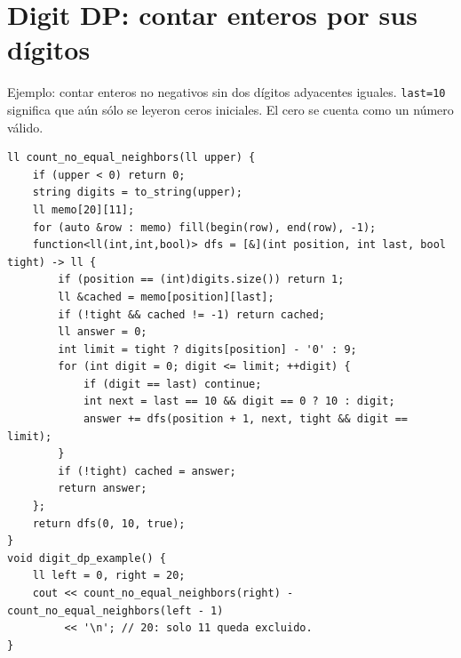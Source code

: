 \section{Digit DP: contar enteros por sus d\'igitos}

Ejemplo: contar enteros no negativos sin dos d\'igitos adyacentes iguales.
\texttt{last=10} significa que a\'un s\'olo se leyeron ceros iniciales.
El cero se cuenta como un n\'umero v\'alido.

\begin{lstlisting}[style=cpp]
ll count_no_equal_neighbors(ll upper) {
    if (upper < 0) return 0;
    string digits = to_string(upper);
    ll memo[20][11];
    for (auto &row : memo) fill(begin(row), end(row), -1);
    function<ll(int,int,bool)> dfs = [&](int position, int last, bool tight) -> ll {
        if (position == (int)digits.size()) return 1;
        ll &cached = memo[position][last];
        if (!tight && cached != -1) return cached;
        ll answer = 0;
        int limit = tight ? digits[position] - '0' : 9;
        for (int digit = 0; digit <= limit; ++digit) {
            if (digit == last) continue;
            int next = last == 10 && digit == 0 ? 10 : digit;
            answer += dfs(position + 1, next, tight && digit == limit);
        }
        if (!tight) cached = answer;
        return answer;
    };
    return dfs(0, 10, true);
}
void digit_dp_example() {
    ll left = 0, right = 20;
    cout << count_no_equal_neighbors(right) - count_no_equal_neighbors(left - 1)
         << '\n'; // 20: solo 11 queda excluido.
}
\end{lstlisting}

